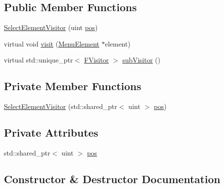 \subsection*{Public Member Functions}
\begin{DoxyCompactItemize}
\item 
\hyperlink{classSelectElementVisitor_a4f37877d76bd362bdc5168eda70a4f6f}{Select\+Element\+Visitor} (uint \hyperlink{classSelectElementVisitor_a6a3a2d25639fe5e0112a52b3622d2cb1}{pos})
\item 
virtual void \hyperlink{classSelectElementVisitor_af2dabf443aa6b32b253ca05baf3b780f}{visit} (\hyperlink{classMenuElement}{Menu\+Element} $\ast$element)
\item 
virtual std\+::unique\+\_\+ptr$<$ \hyperlink{classFVisitor}{F\+Visitor} $>$ \hyperlink{classSelectElementVisitor_afa97120c24b6f67f81dfdb65bd243949}{sub\+Visitor} ()
\end{DoxyCompactItemize}
\subsection*{Private Member Functions}
\begin{DoxyCompactItemize}
\item 
\hyperlink{classSelectElementVisitor_aab7a8b4f9292063876c4884964d21592}{Select\+Element\+Visitor} (std\+::shared\+\_\+ptr$<$ uint $>$ \hyperlink{classSelectElementVisitor_a6a3a2d25639fe5e0112a52b3622d2cb1}{pos})
\end{DoxyCompactItemize}
\subsection*{Private Attributes}
\begin{DoxyCompactItemize}
\item 
std\+::shared\+\_\+ptr$<$ uint $>$ \hyperlink{classSelectElementVisitor_a6a3a2d25639fe5e0112a52b3622d2cb1}{pos}
\end{DoxyCompactItemize}


\subsection{Constructor \& Destructor Documentation}
\hypertarget{classSelectElementVisitor_a4f37877d76bd362bdc5168eda70a4f6f}{}
